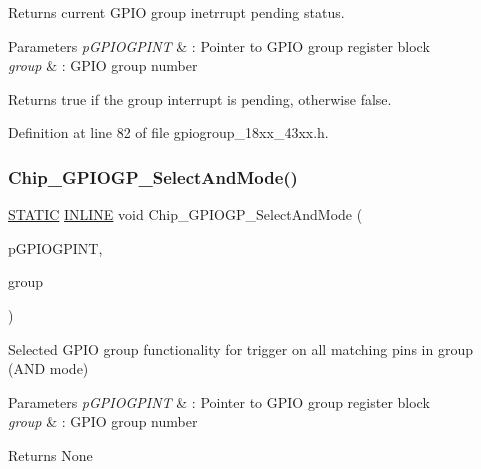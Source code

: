 Returns current G\+P\+IO group inetrrupt pending status. 


\begin{DoxyParams}{Parameters}
{\em p\+G\+P\+I\+O\+G\+P\+I\+NT} & \+: Pointer to G\+P\+IO group register block \\
\hline
{\em group} & \+: G\+P\+IO group number \\
\hline
\end{DoxyParams}
\begin{DoxyReturn}{Returns}
true if the group interrupt is pending, otherwise false. 
\end{DoxyReturn}


Definition at line 82 of file gpiogroup\+\_\+18xx\+\_\+43xx.\+h.

\mbox{\label{group___g_p_i_o_g_p__18_x_x__43_x_x_gab829f4b04c6e3359b7ed5ce18f3a57a0}} 
\subsubsection{\texorpdfstring{Chip\+\_\+\+G\+P\+I\+O\+G\+P\+\_\+\+Select\+And\+Mode()}{Chip\_GPIOGP\_SelectAndMode()}}
{\footnotesize\ttfamily \hyperlink{group___l_p_c___types___public___macros_ga10b2d890d871e1489bb02b7e70d9bdfb}{S\+T\+A\+T\+IC} \hyperlink{spifi__18xx__43xx_8h_a2eb6f9e0395b47b8d5e3eeae4fe0c116}{I\+N\+L\+I\+NE} void Chip\+\_\+\+G\+P\+I\+O\+G\+P\+\_\+\+Select\+And\+Mode (\begin{DoxyParamCaption}\item[{\hyperlink{struct_l_p_c___g_p_i_o_g_r_o_u_p_i_n_t___t}{L\+P\+C\+\_\+\+G\+P\+I\+O\+G\+R\+O\+U\+P\+I\+N\+T\+\_\+T} $\ast$}]{p\+G\+P\+I\+O\+G\+P\+I\+NT,  }\item[{uint8\+\_\+t}]{group }\end{DoxyParamCaption})}



Selected G\+P\+IO group functionality for trigger on all matching pins in group (A\+ND mode) 


\begin{DoxyParams}{Parameters}
{\em p\+G\+P\+I\+O\+G\+P\+I\+NT} & \+: Pointer to G\+P\+IO group register block \\
\hline
{\em group} & \+: G\+P\+IO group number \\
\hline
\end{DoxyParams}
\begin{DoxyReturn}{Returns}
None 
\end{DoxyReturn}


